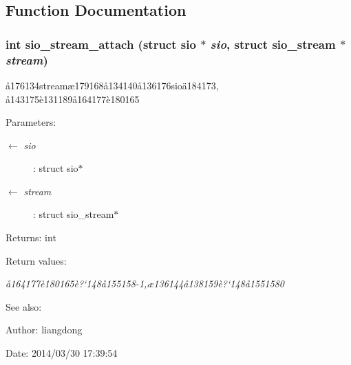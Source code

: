 \subsection{Function Documentation}
\subsubsection{\setlength{\rightskip}{0pt plus 5cm}int sio\_\-stream\_\-attach (struct sio $\ast$ {\em sio}, struct sio\_\-stream $\ast$ {\em stream})}\label{sio__stream_8c_a10}


\aa{}176134stream\ae{}179168\aa{}134140\aa{}136176sio\"{a}184173, \aa{}143175\`{e}131189\aa{}164177\`{e}180165 

\begin{Desc}
\item[Parameters:]
\begin{description}
\item[\mbox{$\leftarrow$} {\em sio}]: struct sio$\ast$ \item[\mbox{$\leftarrow$} {\em stream}]: struct sio\_\-stream$\ast$ \end{description}
\end{Desc}
\begin{Desc}
\item[Returns:]int \end{Desc}
\begin{Desc}
\item[Return values:]
\begin{description}
\item[{\em \aa{}164177\`{e}180165\`{e}?`148\aa{}155158-1,\ae{}136144\aa{}138159\`{e}?`148\aa{}1551580}]\end{description}
\end{Desc}
\begin{Desc}
\item[See also:]\end{Desc}
\begin{Desc}
\item[Author:]liangdong \end{Desc}
\begin{Desc}
\item[Date:]2014/03/30 17:39:54 \end{Desc}
